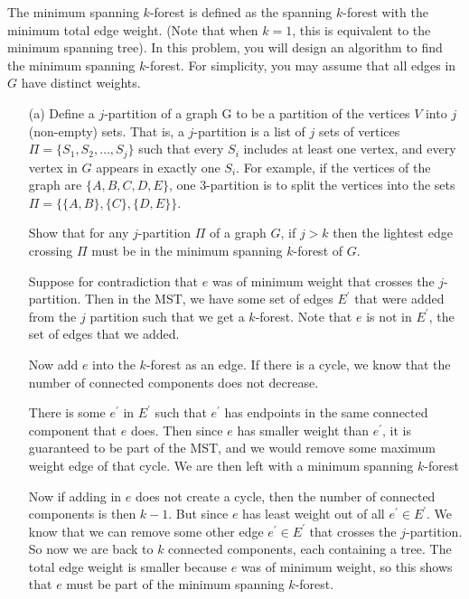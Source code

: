 \documentclass{article}
\begin{document}
The minimum spanning $k$-forest is defined as the spanning $k$-forest with the minimum total edge weight. (Note that when $k = 1$, this is equivalent to the minimum spanning tree). In this problem, you will design an algorithm to find the minimum spanning $k$-forest. For simplicity, you may assume that all edges in $G$ have distinct weights.
    \begin{itemize}
        \item [(a)] Define a $j$-partition of a graph G to be a partition of the vertices $V$ into $j$ (non-empty) sets. That is, a $j$-partition is a list of $j$ sets of vertices $\Pi = \{S_{1}, S_{2}, \ldots, S_{j}\}$ such that every $S_{i}$ includes at least one vertex, and every vertex in $G$ appears in exactly one $S_{i}$. For example, if the vertices of the graph are $\{A, B, C, D, E\}$, one $3$-partition is to split the vertices into the sets $\Pi = \{\{A, B\}, \{C\}, \{D, E\}\}$.

        Show that for any $j$-partition $\Pi$ of a graph $G$, if $j > k$ then the lightest edge crossing $\Pi$ must be in the minimum spanning $k$-forest of $G$.
            \begin{answer}
                Suppose for contradiction that $e$ was of minimum weight that crosses the $j$-partition. Then in the MST, we have some set of edges $E^{\prime}$ that were added from the $j$ partition such that we get a $k$-forest. Note that $e$ is not in $E^{\prime}$, the set of edges that we added.

                Now add $e$ into the $k$-forest as an edge. If there is a cycle, we know that the number of connected components does not decrease.

                There is some $e^{\prime}$ in $E^{\prime}$ such that $e^{\prime}$ has endpoints in the same connected component that $e$ does. Then since $e$ has smaller weight than $e^{\prime}$, it is guaranteed to be part of the MST, and we would remove some maximum weight edge of that cycle. We are then left with a minimum spanning $k$-forest

                Now if adding in $e$ does not create a cycle, then the number of connected components is then $k - 1$. But since $e$ has least weight out of all $e^{\prime} \in E^{\prime}$. We know that we can remove some other edge $e^{\prime} \in E^{\prime}$ that crosses the $j$-partition. So now we are back to $k$ connected components, each containing a tree. The total edge weight is smaller because $e$ was of minimum weight, so this shows that $e$ must be part of the minimum spanning $k$-forest.
            \end{answer}


\end{itemize}
\end{document}

